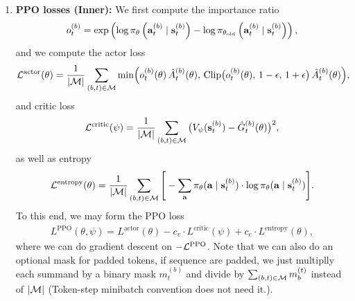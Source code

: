 \documentclass[11pt]{article}  %
\begin{document}
\begin{enumerate}
  \item \textbf{PPO losses (Inner):} We first compute the importance ratio 
  \begin{align*}
    o^{(b)}_t = \exp\left( \log \pi_{\theta}\left( \mathbf{a}_t^{(b)} \mid \mathbf{s}_t^{(b)} \right) -  \log \pi_{\theta_{\text{old}}}\left( \mathbf{a}_t^{(b)} \mid \mathbf{s}_t^{(b)} \right) \right),
  \end{align*}
  and we compute the actor loss
  \begin{align*}
    \mathcal{L}^{\text{actor}}(\theta) = \frac{1}{|\mathcal{M}|} \sum_{(b,t)\in \mathcal{M}}\min\!\Big(o_t^{(b)}(\theta)\,\hat{A}_t^{(b)}(\theta),\,\operatorname{Clip}\!\big(o_t^{(b)}(\theta),\,1-\epsilon,\,1+\epsilon\big)\,\hat{A}_t^{(b)}(\theta)\Big),
  \end{align*}
  and critic loss
  \begin{align*}
    \mathcal{L}^{\text{critic}}(\psi) = \frac{1}{|\mathcal{M}|} \sum_{(b,t)\in\mathcal{M}}\big( V_{\psi}(\mathbf{s}_t^{(b)}) - \hat{G}_t^{(b)}(\theta) \big)^2,
  \end{align*}
  as well as entropy 
  \begin{align*}
    \mathcal{L}^{\text{entropy}}(\theta) = \frac{1}{|\mathcal{M}|} \sum_{(b,t)\in\mathcal{M}} \Bigg[ - \sum_{\mathbf{a}} \pi_{\theta}(\mathbf{a} \mid \mathbf{s}_t^{(b)}) \cdot \log \pi_{\theta}(\mathbf{a} \mid \mathbf{s}_t^{(b)}) \Bigg].
  \end{align*}
  To this end, we may form the PPO loss 
  \begin{align*}
    L^{\text{PPO}}(\theta, \psi) = L^{\text{actor}}(\theta) - c_v \cdot L^{\text{critic}}(\psi) + c_e \cdot L^{\text{entropy}}(\theta),
  \end{align*}
  where we can do gradient descent on $-\mathcal{L}^{\text{PPO}}$.
  Note that we can also do an optional mask for padded tokens, if sequence are padded, we just multiplly each summand by a binary mask $m^{(b)}_t$ and divide by $\sum_{(b, t)\in \mathcal{M}}m^{(t)}_b$ instead of $\lvert\mathcal{M}\rvert$ (Token-step minibatch convention does not need it.).
\end{enumerate}
\end{document}
